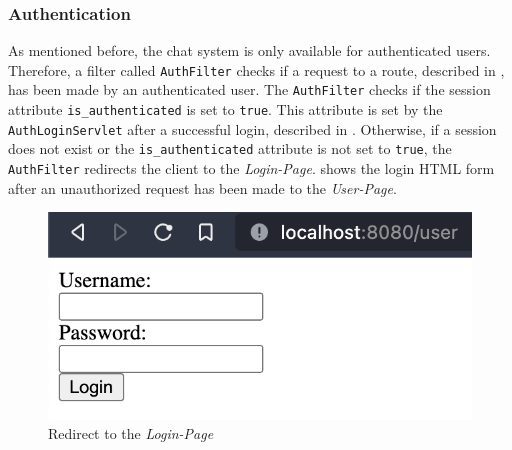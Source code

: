 \subsubsection{Authentication}\label{subsubsec:03_impl_filters_auth}
As mentioned before, the chat system is only available for authenticated users. Therefore, a filter called \texttt{AuthFilter} checks if a request to a route, described in , has been made by an authenticated user.
The \texttt{AuthFilter} checks if the session attribute \texttt{is\_authenticated} is set to \texttt{true}. This attribute is set by the \texttt{AuthLoginServlet} after a successful login, described in .
Otherwise, if a session does not exist or the \texttt{is\_authenticated} attribute is not set to \texttt{true}, the \texttt{AuthFilter} redirects the client to the \textit{Login-Page}.  shows the login HTML form after an unauthorized request has been made to the \textit{User-Page}.
\begin{figure}[h]
\centering
\includegraphics[scale=0.4]{images/03_impl/auth-filter/redirect}
\caption{Redirect to the \textit{Login-Page}}
\label{fig:03_impl_filters_auth_redirect}
\end{figure}


\newpage
